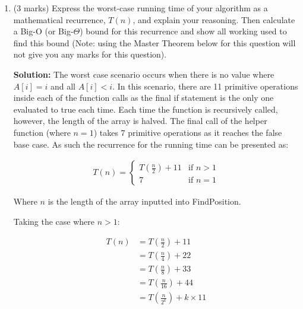 \documentclass[a4,13pt]{extarticle}
\newenvironment{Solution}{\color{blue}\textbf{Solution:}}{}
\begin{document}
\begin{enumerate}
\begin{enumerate}
\begin{Solution}
				FindPositionHelper($[-1, 0, 2, 3, 10, 11, 23, 24, 102]$, $0$, $4$) \\
				\null\qquad middle $= 0 + \frac{4}{2} = 2$ \\
				\null\qquad if $A[2] = 2 \rightarrow$ true \\
				\null\qquad\qquad \textbf{return} true

	      	\end{Solution}
	      	      	      	                  
	      	\item (3 marks) Express the worst-case running time of your algorithm as a mathematical recurrence, $T(n)$, and explain your reasoning. Then calculate a Big-O (or Big-$\Theta$) bound for this recurrence and show all working used to find this bound (Note: using the Master Theorem below for this question will not give you any marks for this question).
	      	      
	      	      
			\begin{Solution}
				The worst case scenario occurs when there is no value where $A[i] = i$ and all $A[i] < i$. In this scenario, there are 11 primitive operations inside each of the function calls as the final if statement is the only one evaluated to true each time. Each time the function is recursively called, however, the length of the array is halved. The final call of the helper function (where $n = 1$) takes 7 primitive operations as it reaches the false base case. As such the recurrence for the running time can be presented as:

				\begin{align*}
					T(n) = \begin{cases}
						T(\frac{n}{2}) + 11 & \text{if } n > 1
						\\
						7 & \text{if } n = 1
					\end{cases}
				\end{align*}

				Where $n$ is the length of the array inputted into FindPosition. 

				Taking the case where $n > 1$:
				
				\begin{align*}
					T(n) & = T(\frac{n}{2}) + 11 \\
						 & = T(\frac{n}{4}) + 22 \\
						 & = T(\frac{n}{8}) + 33 \\
						 & = T(\frac{n}{16}) + 44 \\
						 & = T(\frac{n}{2^k}) + k \times 11 \\
				\end{align*}


\end{Solution}
\end{enumerate}
\end{enumerate}
\end{document}
